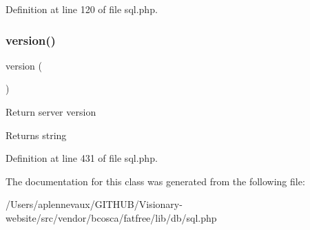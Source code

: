 Definition at line 120 of file sql.\+php.

\hypertarget{class_d_b_1_1_s_q_l_a6080dae0886626b9a4cedb29240708b1}{}\label{class_d_b_1_1_s_q_l_a6080dae0886626b9a4cedb29240708b1} 
\subsubsection{\texorpdfstring{version()}{version()}}
{\footnotesize\ttfamily version (\begin{DoxyParamCaption}{ }\end{DoxyParamCaption})}

Return server version \begin{DoxyReturn}{Returns}
string 
\end{DoxyReturn}


Definition at line 431 of file sql.\+php.



The documentation for this class was generated from the following file\+:\begin{DoxyCompactItemize}
\item 
/\+Users/aplennevaux/\+G\+I\+T\+H\+U\+B/\+Visionary-\/website/src/vendor/bcosca/fatfree/lib/db/sql.\+php\end{DoxyCompactItemize}
